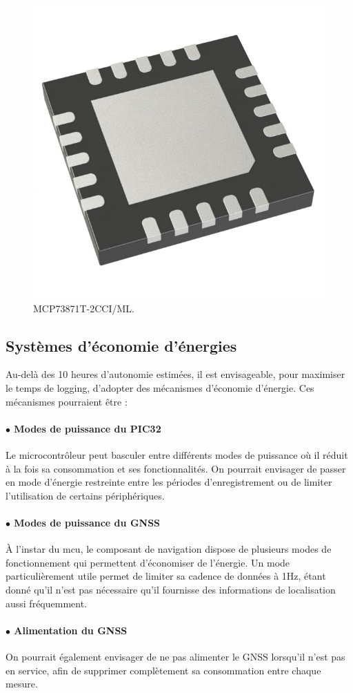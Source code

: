 \begin{figure}[h]
	\centering
	\includegraphics[width=0.2\linewidth]{../figures/pre_etude/MCP}
	\caption{MCP73871T-2CCI/ML.}
	\label{fig:mcp}
\end{figure}

\clearpage

\subsection{Systèmes d'économie d'énergies} 

Au-delà des 10 heures d'autonomie estimées, il est envisageable, pour maximiser le temps de logging, d'adopter des mécanismes d'économie d'énergie. Ces mécanismes pourraient être :

\paragraph{$\bullet$ Modes de puissance du PIC32} Le microcontrôleur peut basculer entre différents modes de puissance où il réduit à la fois sa consommation et ses fonctionnalités. On pourrait envisager de passer en mode d'énergie restreinte entre les périodes d'enregistrement ou de limiter l'utilisation de certains périphériques.

\paragraph{$\bullet$ Modes de puissance du \gls{GNSS}} À l'instar du \gls{mcu}, le composant de navigation dispose de plusieurs modes de fonctionnement qui permettent d'économiser de l'énergie. Un mode particulièrement utile permet de limiter sa cadence de données à 1Hz, étant donné qu'il n'est pas nécessaire qu'il fournisse des informations de localisation aussi fréquemment.

\paragraph{$\bullet$ Alimentation du \gls{GNSS}} On pourrait également envisager de ne pas alimenter le \gls{GNSS} lorsqu'il n'est pas en service, afin de supprimer complètement sa consommation entre chaque mesure.

